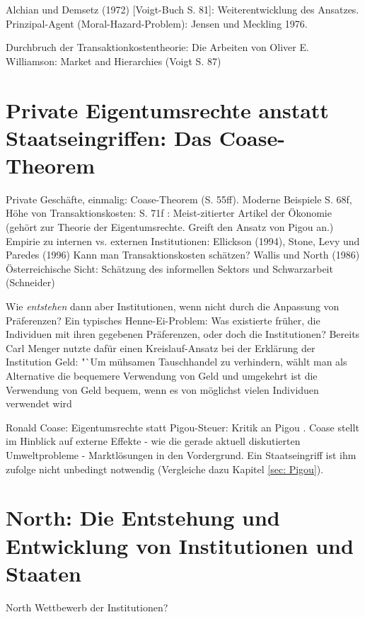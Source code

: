Alchian und Demsetz (1972) [Voigt-Buch S. 81]: Weiterentwicklung des Ansatzes.
Prinzipal-Agent (Moral-Hazard-Problem): Jensen und Meckling 1976.

Durchbruch der Transaktionkostentheorie: Die Arbeiten von Oliver E. Williamson: Market and Hierarchies (Voigt S. 87)


\section{Private Eigentumsrechte anstatt Staatseingriffen: Das Coase-Theorem}
\label{Coase-Theorem}

Private Geschäfte, einmalig: Coase-Theorem (S. 55ff). Moderne Beispiele S. 68f, Höhe von Transaktionskosten: S. 71f
\textcite{Coase1960}: Meist-zitierter Artikel der Ökonomie (gehört zur Theorie der Eigentumsrechte. Greift den Ansatz von Pigou an.)
Empirie zu internen vs. externen Institutionen: Ellickson (1994), Stone, Levy und Paredes (1996)
Kann man Transaktionskosten schätzen? Wallis und North (1986)
Österreichische Sicht: Schätzung des informellen Sektors und Schwarzarbeit (Schneider)









 Wie \textit{entstehen} dann aber Institutionen, wenn nicht durch die Anpassung von Präferenzen? Ein typisches Henne-Ei-Problem: Was existierte früher, die Individuen mit ihren gegebenen Präferenzen, oder doch die Institutionen? Bereits Carl Menger nutzte dafür einen Kreislauf-Ansatz bei der Erklärung der Institution Geld: "`Um mühsamen Tauschhandel zu verhindern, wählt man als Alternative die bequemere Verwendung von Geld und umgekehrt ist die Verwendung von Geld bequem, wenn es von möglichst vielen Individuen verwendet wird \parencite[S.176]{Hodgson1998}


Ronald Coase: Eigentumsrechte statt Pigou-Steuer: Kritik an Pigou \textcite[S. 243]{Cansier1989}. Coase stellt im Hinblick auf externe Effekte - wie die gerade aktuell diskutierten Umweltprobleme - Marktlösungen in den Vordergrund. Ein Staatseingriff ist ihm zufolge nicht unbedingt notwendig (Vergleiche dazu Kapitel \ref{sec: Pigou}).


\section{North: Die Entstehung und Entwicklung von Institutionen und Staaten}
North
Wettbewerb der Institutionen?



